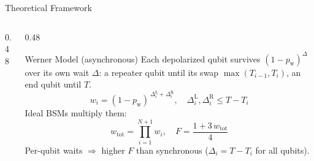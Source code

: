 \documentclass[aspectratio=169, 11pt]{beamer}
\newcommand{\pw}{p_{\mathrm{w}}}
\newcommand{\ps}{p_{\mathrm{s}}}
\begin{document}
\begin{frame}{Theoretical Framework}
  \begin{columns}[T]
    \begin{column}{0.48\textwidth}
    \end{column}
    \begin{column}{0.48\textwidth}
      \begin{block}{Werner Model (asynchronous)}
        \small
        Each depolarized qubit survives $(1-\pw)^{\Delta}$ over its own wait
        $\Delta$: a repeater qubit until its swap $\max(T_{i-1},T_i)$, an end
        qubit until $T$.
        \vspace{-0.2em}
        \[
          w_i = (1-\pw)^{\,\Delta^{\mathrm{L}}_i + \Delta^{\mathrm{R}}_i}, \quad
          \Delta^{\mathrm{L}}_i,\Delta^{\mathrm{R}}_i \le T - T_i
        \]
        Ideal BSMs multiply them:
        \vspace{-0.2em}
        \[
          w_{\mathrm{tot}} = \prod_{i=1}^{N+1} w_i, \quad F = \frac{1 + 3\, w_{\mathrm{tot}}}{4}
        \]
        \alert{Per-qubit} waits $\Rightarrow$ higher $F$ than synchronous
        ($\Delta_i = T - T_i$ for all qubits).
      \end{block}
    \end{column}
  \end{columns}
\end{frame}
\end{document}
